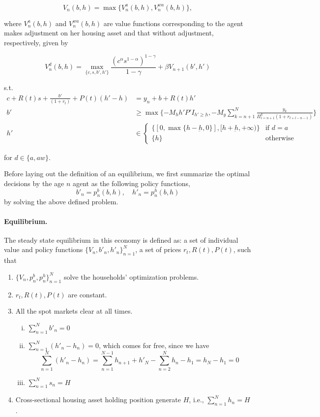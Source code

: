 \documentclass[a4paper,10pt]{article}
\begin{document}
\[
V_n(b,h)=\max \{V_n^{a}(b,h),V_n^{wa}(b,h)\},
\]

where $V_n^{a}(b,h)$ and $V_n^{wa}(b,h)$ are value functions corresponding to the agent makes adjustment on her housing asset and that without adjustment, respectively, given by

\[
V_n^{d}(b,h) = \max_{\{c, s, b',h'\}}  \frac{(c^\alpha s^{1-\alpha})^{1-\gamma}}{1-\gamma} + \beta V_{n+1}(b',h')
\]

s.t.
\begin{align*}
c+ R(t)s+\frac{b'}{(1+r_{t})}+P(t)(h'-h)&= y_n+b+R(t)h' \\
b'&\ge \max\{-M_h h'P'I_{h'\ge\underbar{h}}, -M_y \sum_{k=n+1}^{N}\frac{y_k}{\Pi_{l=n+1}^{k}(1+r_{t+l-n-1})}\}\\
h'&\in \left\{ \begin{array}{ll}
\{[0,\max \{h-\underbar{h},0\}],[h+\underbar{h},+\infty)\} & \mbox{if $d=a$}\\
\{h\}& \mbox{otherwise}
\end{array}
\right.
\end{align*}

for $d\in\{a,aw\}$.

Before laying out the definition of an equilibrium, we first summarize the optimal decisions by the age $n$ agent as the following policy functions,
\[
b'_n=p_n^b(b,h),\quad h'_n=p_n^h(b,h)
\]
by solving the above defined problem.
\vspace{2cm}

\paragraph{Equilibrium.}
The steady state equilibrium in this economy is defined as: a set of individual value and policy functions $\{V_n,b'_n,h'_n\}_{n=1}^{N}$, a set of prices $r_t,R(t),P(t)$, such that

\begin{enumerate}
  \item $\{V_n,p_n^b,p_n^h\}_{n=1}^{N}$ solve the households' optimization problems.
  \item $r_t,R(t),P(t)$ are constant.
  \item All the spot markets clear at all times.
  \begin{enumerate}[(i)]
    \item  $\sum_{n=1}^{N} b'_n = 0$
    \item  $\sum_{n=1}^{N} (h'_n-h_n)= 0$, which comes for free, since we have
    \[
    \sum_{n=1}^{N} (h'_n-h_n)= \sum_{n=1}^{N-1} h_{n+1} + h'_N-\sum_{n=2}^{N} h_{n}-h_1 = h_N-h_1=0
    \]
    \item  $\sum_{n=1}^{N} s_n = H$
  \end{enumerate}
  \item Cross-sectional housing asset holding position generate $H$, i.e., $\sum_{n=1}^{N} h_n= H$.
\end{enumerate}
\end{document}

